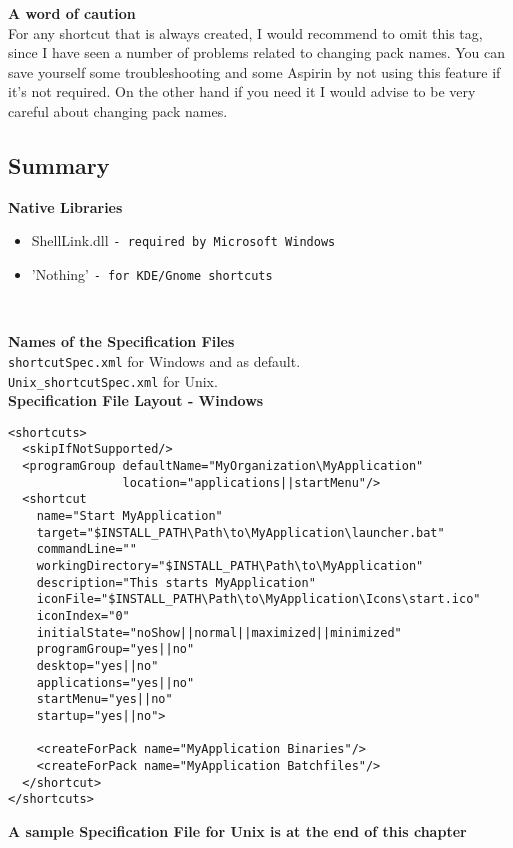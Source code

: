 \textbf{A word of caution}\\

For any shortcut that is always created, I would recommend to omit this
tag, since I have seen a number of problems related to changing pack
names. You can save yourself some troubleshooting and some Aspirin by
not using this feature if it's not required. On the other hand if you
need it I would advise to be very careful about changing pack names.\\

\subsection{Summary}

\textbf{Native Libraries}
\begin{itemize}
\item ShellLink.dll \texttt{- required by Microsoft Windows}
\item 'Nothing' \texttt{- for KDE/Gnome shortcuts}
\end{itemize}\

\textbf{Names of the Specification Files}\\
\texttt{shortcutSpec.xml} for Windows and as default.\\
\texttt{Unix\_shortcutSpec.xml} for Unix.\\

\textbf{Specification File Layout - Windows}
\footnotesize

\begin{verbatim}
<shortcuts>
  <skipIfNotSupported/>
  <programGroup defaultName="MyOrganization\MyApplication"
                location="applications||startMenu"/>
  <shortcut
    name="Start MyApplication"
    target="$INSTALL_PATH\Path\to\MyApplication\launcher.bat"
    commandLine=""
    workingDirectory="$INSTALL_PATH\Path\to\MyApplication"
    description="This starts MyApplication"
    iconFile="$INSTALL_PATH\Path\to\MyApplication\Icons\start.ico"
    iconIndex="0"
    initialState="noShow||normal||maximized||minimized"
    programGroup="yes||no"
    desktop="yes||no"
    applications="yes||no"
    startMenu="yes||no"
    startup="yes||no">

    <createForPack name="MyApplication Binaries"/>
    <createForPack name="MyApplication Batchfiles"/>
  </shortcut>
</shortcuts>
\end{verbatim}
\normalsize

\textbf{A sample Specification File for Unix is at the end of this chapter}

